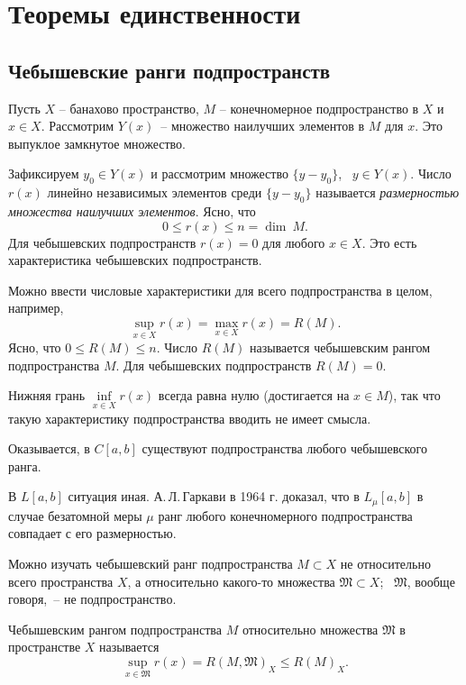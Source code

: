 
\chapter{Теоремы единственности}

\section{Чебышевские ранги подпространств}

Пусть $X$ -- банахово пространство, $M$ -- конечномерное
подпространство в $X$ и $x\in X$. Рассмотрим $Y(x)$~-- множество
наилучших элементов в $M$ для $x$. Это выпуклое замкнутое множество.

Зафиксируем $y_0\in Y(x)$ и рассмотрим множество $\{y-y_0\}$,~ $y\in Y(x)$.
Число $r(x)$ линейно независимых элементов среди $\{y-y_0\}$
называется \textit{размерностью множества наилучших элементов}. Ясно, что
$$ 0\le r(x)\le n = \dim\ M. $$
Для чебышевских подпространств $r(x)=0$ для любого $x\in X$. Это есть
характеристика чебышевских подпространств.

Можно ввести числовые характеристики для всего
подпространства в целом, например,
$$
\sup_{x\in X} r(x)=\max_{x\in X} r(x)=R(M).
$$
Ясно, что $0\le R(M)\le n$. Число $R(M)$ называется чебышевским рангом подпространства
$M$. Для чебышевских подпространств $R(M)=0$.

Нижняя грань
$\inf\limits_{x\in X} r(x)$ всегда равна нулю (достигается на $x\in M$), так
что такую характеристику подпространства вводить не имеет смысла.

Оказывается, в $C[a,b]$ существуют подпространства любого чебышевского ранга.

В $L[a,b]$ ситуация иная. А.\,Л.\,Гаркави в 1964 г.
доказал, что в $L_{\mu}[a,b]$ в случае безатомной меры
$\mu$ ранг любого конечномерного подпространства совпадает
с его размерностью.

Можно изучать чебышевский ранг подпространства $M\subset X$ не относительно
всего пространства $X$, а относительно какого-то множества
$\mathfrak M \subset X$;~ $\mathfrak M$, вообще говоря,~-- не подпространство.

Чебышевским рангом подпространства $M$ относительно множества
$\mathfrak M$ в пространстве $X$ называется
$$
\sup_{x\in \mathfrak M} r(x)=R(M,\mathfrak M)_X\le R(M)_X.
$$

